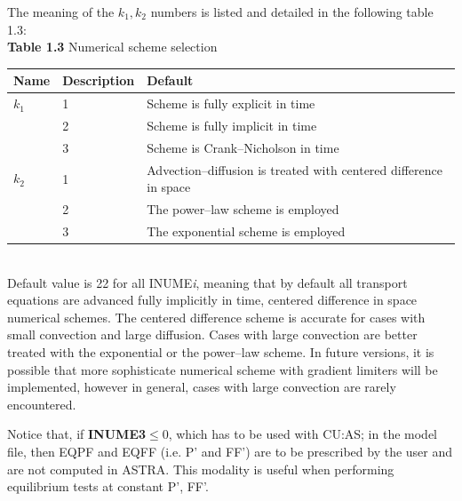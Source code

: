 The meaning of the $k_1,k_2$ numbers is listed and detailed in the following table 1.3:
\\
{\bf Table 1.3} Numerical scheme selection\\[2ex]
\begin{tabular}{|l|l|l|}					\hline
\bf Name	&\bf Description & Default\\ \hline
\tt $k_1$	& 1 & Scheme is fully explicit in time \\ 
\tt 	& 2 & Scheme is fully implicit in time \\ 
\tt 	& 3 & Scheme is Crank--Nicholson in time \\ 
\tt $k_2$ & 1 & Advection--diffusion is treated with centered difference in space\\
\tt  	& 2 &  The power--law scheme is employed \\ 
\tt & 3&  The exponential scheme is employed \\ 
\hline
\end{tabular}
\bigskip\\
Default value is 22 for all INUME{\it i}, meaning that by default all transport 
equations are advanced fully implicitly in time, centered difference in space
numerical schemes.
The centered difference scheme is accurate for cases with small convection and 
large diffusion. Cases with large convection are better treated with the 
exponential or the power--law scheme. In future versions, it is possible that 
more sophisticate numerical scheme with gradient limiters will be implemented, 
however in general, cases with large convection are rarely encountered.

Notice that, if {\bf INUME3}$\leq 0$, which has to be used with CU:AS; in the model file, 
then EQPF and EQFF (i.e. P' and FF') are to be prescribed by the user and are not computed in ASTRA. This
modality is useful when performing equilibrium tests at constant P', FF'.

\clearpage
